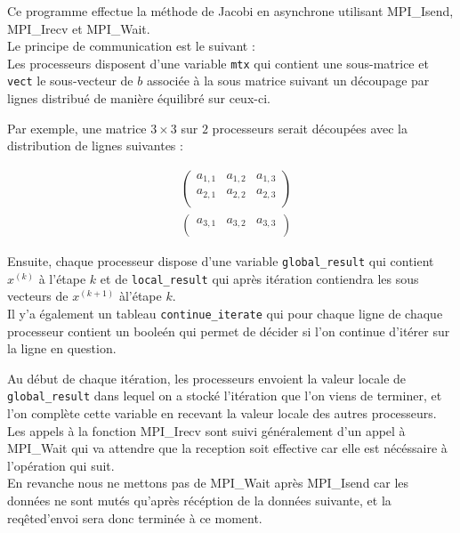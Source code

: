\documentclass[11pt, a4paper]{article}
\begin{document}
Ce programme effectue la méthode de Jacobi en asynchrone utilisant MPI\_Isend, MPI\_Irecv et MPI\_Wait.\\

Le principe de communication est le suivant :\\

Les processeurs disposent d'une variable \texttt{mtx} qui contient une sous-matrice et \texttt{vect} le sous-vecteur de $b$ associée à la sous matrice suivant un découpage par lignes distribué de manière équilibré sur ceux-ci.

Par exemple, une matrice $3 \times 3$ sur $2$ processeurs serait découpées avec la distribution de lignes suivantes :

\begin{align*}
    &\begin{pmatrix}
        a_{1,1} & a_{1,2} & a_{1,3}\\
        a_{2,1} & a_{2,2} & a_{2,3}\\
    \end{pmatrix} \\
    &\begin{pmatrix}
        a_{3,1} & a_{3,2} & a_{3,3}\\
    \end{pmatrix}
\end{align*}


Ensuite, chaque processeur dispose d'une variable \texttt{global\_result} qui contient $x^{(k)}$ à l'étape $k$ et de \texttt{local\_result} qui après itération contiendra les sous vecteurs de $x^{(k+1)}$ àl'étape $k$.\\

Il y'a également un tableau \texttt{continue\_iterate} qui pour chaque ligne de chaque processeur contient un booleén qui permet de décider si l'on continue d'itérer sur la ligne en question.

Au début de chaque itération, les processeurs envoient la valeur locale de \texttt{global\_result} dans lequel on a stocké l'itération que l'on viens de terminer, et l'on complète cette variable en recevant la valeur locale des autres processeurs.\\

Les appels à la fonction MPI\_Irecv sont suivi généralement d'un appel à MPI\_Wait qui va attendre que la reception soit effective car elle est nécéssaire à l'opération qui suit.\\

En revanche nous ne mettons pas de MPI\_Wait après MPI\_Isend car les données ne sont mutés qu'après récéption de la données suivante, et la req\^eted'envoi sera donc terminée à ce moment.\\
\end{document}
